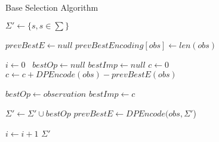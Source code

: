 \begin{algorithm}
\caption{Base Selection Algorithm}
\label{Base Selection}
\begin{algorithmic}[1]
\State $\Sigma' \gets \{s, s \in \sum \}$

\State $prevBestE \gets null$
	\State $prevBestEncoding[obs] \gets len(obs)$
\EndFor

\State $i\gets 0$\
	\State $bestOp \gets null$
	\State $bestImp \gets null$
		\State $c \gets 0$
			\State $c \gets c+DPEncode(obs)-prevBestE(obs)$
		\EndFor
		
			\State $bestOp \gets observation$
			\State $bestImp \gets c$
		\EndIf
		
	\EndFor

	\State $\Sigma' \gets \Sigma' \cup bestOp$
		\State $prevBestE \gets DPEncode(obs,\Sigma'$) 
	\EndFor	
	
	\State $i \gets i + 1$
\EndWhile 
\Return $\Sigma'$

\EndProcedure
\end{algorithmic}
\end{algorithm}

